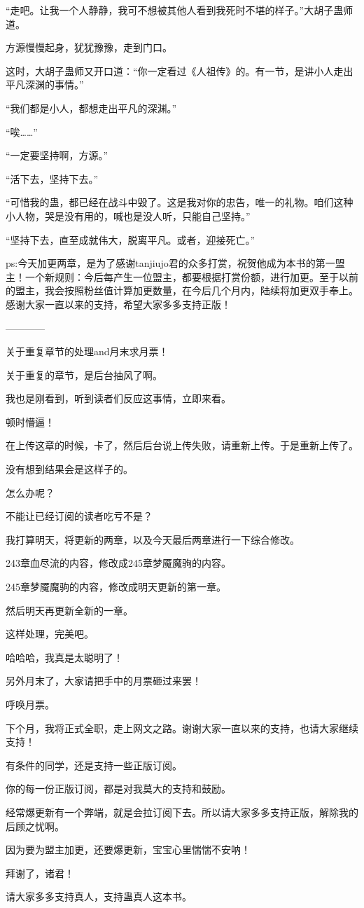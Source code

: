 \begin{this_body}
“走吧。让我一个人静静，我可不想被其他人看到我死时不堪的样子。”大胡子蛊师道。

方源慢慢起身，犹犹豫豫，走到门口。

这时，大胡子蛊师又开口道：“你一定看过《人祖传》的。有一节，是讲小人走出平凡深渊的事情。”

“我们都是小人，都想走出平凡的深渊。”

“唉……”

“一定要坚持啊，方源。”

“活下去，坚持下去。”

“可惜我的蛊，都已经在战斗中毁了。这是我对你的忠告，唯一的礼物。咱们这种小人物，哭是没有用的，喊也是没人听，只能自己坚持。”

“坚持下去，直至成就伟大，脱离平凡。或者，迎接死亡。”

ps:今天加更两章，是为了感谢tanjiujo君的众多打赏，祝贺他成为本书的第一盟主！一个新规则：今后每产生一位盟主，都要根据打赏份额，进行加更。至于以前的盟主，我会按照粉丝值计算加更数量，在今后几个月内，陆续将加更双手奉上。感谢大家一直以来的支持，希望大家多多支持正版！

------------

关于重复章节的处理and月末求月票！

关于重复的章节，是后台抽风了啊。

我也是刚看到，听到读者们反应这事情，立即来看。

顿时懵逼！

在上传这章的时候，卡了，然后后台说上传失败，请重新上传。于是重新上传了。

没有想到结果会是这样子的。

怎么办呢？

不能让已经订阅的读者吃亏不是？

我打算明天，将更新的两章，以及今天最后两章进行一下综合修改。

243章血尽流的内容，修改成245章梦魇魔驹的内容。

245章梦魇魔驹的内容，修改成明天更新的第一章。

然后明天再更新全新的一章。

这样处理，完美吧。

哈哈哈，我真是太聪明了！

另外月末了，大家请把手中的月票砸过来罢！

呼唤月票。

下个月，我将正式全职，走上网文之路。谢谢大家一直以来的支持，也请大家继续支持！

有条件的同学，还是支持一些正版订阅。

你的每一份正版订阅，都是对我莫大的支持和鼓励。

经常爆更新有一个弊端，就是会拉订阅下去。所以请大家多多支持正版，解除我的后顾之忧啊。

因为要为盟主加更，还要爆更新，宝宝心里惴惴不安呐！

拜谢了，诸君！

请大家多多支持真人，支持蛊真人这本书。

\end{this_body}


